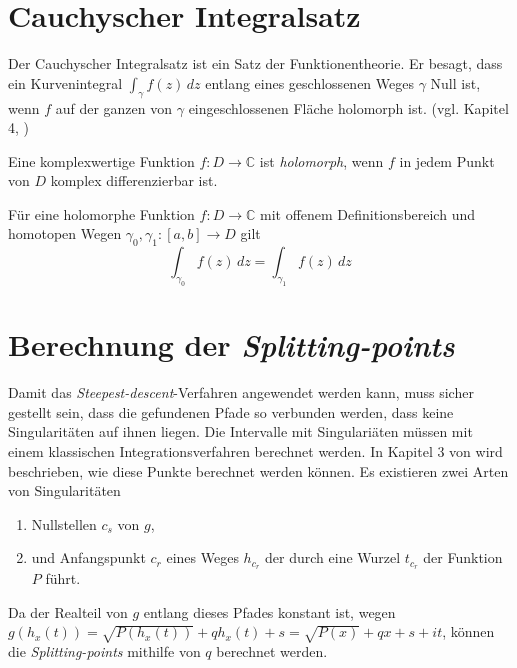 \section{Cauchyscher Integralsatz}

Der Cauchyscher Integralsatz ist ein Satz der Funktionentheorie. Er besagt, dass ein Kurvenintegral $\int_{\gamma}^{} f(z)\,dz $ entlang eines geschlossenen Weges $\gamma$ Null ist, wenn
$f$ auf der ganzen von $\gamma$ eingeschlossenen Fläche holomorph ist. (vgl. Kapitel 4, \cite{futheo})

Eine komplexwertige Funktion $f: D \rightarrow \mathbb{C}$ ist \textit{holomorph}, wenn $f$ in jedem Punkt von $D$ komplex differenzierbar ist.
\cite{futheo}

Für eine holomorphe Funktion $f: D \rightarrow \mathbb{C}$ mit offenem Definitionsbereich und homotopen Wegen $\gamma_0, \gamma_1: [a,b] \rightarrow D$ gilt 
\begin{equation}
    \int_{\gamma_0}^{} f(z) \,dz = \int_{\gamma_1}^{} f(z) \,dz 
\end{equation}


\section{Berechnung der \textit{Splitting-points}}

Damit das \textit{Steepest-descent}-Verfahren angewendet werden kann, muss sicher gestellt sein, dass 
die gefundenen Pfade so verbunden werden, dass keine Singularitäten auf ihnen liegen.
Die Intervalle mit Singulariäten müssen mit einem klassischen Integrationsverfahren berechnet werden.
In Kapitel 3 von \cite{gasperini:hal-03209144} wird beschrieben, wie diese Punkte berechnet werden können.
Es existieren zwei Arten von Singularitäten
\begin{enumerate}
    \item Nullstellen $c_s$ von $g$,
    \item und Anfangspunkt $c_r$ eines Weges $h_{c_r}$ der durch eine Wurzel $t_{c_r}$ der Funktion $P$ führt. 
\end{enumerate}

Da der Realteil von $g$ entlang dieses Pfades konstant ist, wegen $g(h_x(t)) = \sqrt{P(h_x(t))} + qh_x(t) + s = \sqrt{P(x)} + qx + s + it$, können die \textit{Splitting-points} mithilfe von $q$ berechnet werden.

